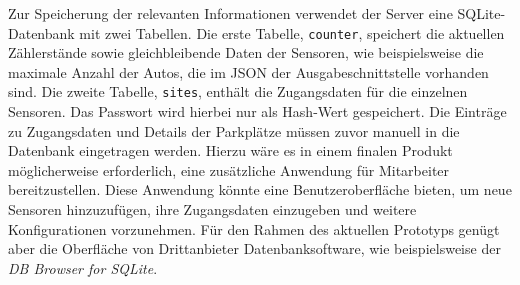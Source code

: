 Zur Speicherung der relevanten Informationen verwendet der Server eine SQLite-Datenbank mit zwei Tabellen.
Die erste Tabelle, \lstinline|counter|, speichert die aktuellen Zählerstände sowie gleichbleibende Daten der Sensoren, wie beispielsweise die maximale Anzahl der Autos, die im JSON der Ausgabeschnittstelle vorhanden sind.
Die zweite Tabelle, \lstinline|sites|, enthält die Zugangsdaten für die einzelnen Sensoren.
Das Passwort wird hierbei nur als Hash-Wert gespeichert.
Die Einträge zu Zugangsdaten und Details der Parkplätze müssen zuvor manuell in die Datenbank eingetragen werden.
Hierzu wäre es in einem finalen Produkt möglicherweise erforderlich, eine zusätzliche Anwendung für Mitarbeiter bereitzustellen.
Diese Anwendung könnte eine Benutzeroberfläche bieten, um neue Sensoren hinzuzufügen, ihre Zugangsdaten einzugeben und weitere Konfigurationen vorzunehmen.
Für den Rahmen des aktuellen Prototyps genügt aber die Oberfläche von Drittanbieter Datenbanksoftware, wie beispielsweise der \textit{DB Browser for SQLite}.
